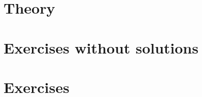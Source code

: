 \documentclass[11pt]{report}
\begin{document}
\part{Theory}

\def\slides{slides/01_intro.pdf}


\def\slides{slides/02_crypto.pdf}


\def\slides{slides/03_authN.pdf}


\def\slides{slides/04_netsec_p1.pdf}


\def\slides{slides/05_firewall.pdf}


\def\slides{slides/06_netsec_p2.pdf}


\def\slides{slides/07_schannels.pdf}


\setcounter{chapter}{8} %


\part{Exercises without solutions}

\setcounter{chapter}{20}









\part{Exercises}

\setcounter{chapter}{30}







\appendix
%



\end{document}
